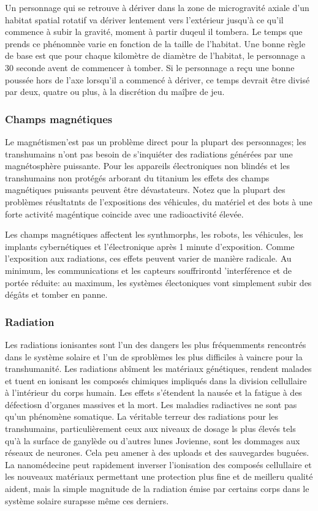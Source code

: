 Un personnage qui se retrouve à dériver dans la zone de microgravité axiale d'un habitat spatial rotatif va dériver lentement vers l'extérieur jusqu'à ce qu'il commence à subir la gravité, moment à partir duqeul il tombera. Le temps que prends ce phénomnèe varie en fonction de la taille de l'habitat. Une bonne règle de base est que pour chaque kilomètre de diamètre de l'habitat, le personnage a 30 seconde avent de commencer à tomber. Si le personnage a reçu une bonne poussée hors de l'axe lorsqu'il a commencé à dériver, ce temps devrait être divisé par deux, quatre ou plus, à la discrétion du maîþre de jeu. 

\subsubsection{Champs magnétiques} 

Le magnétismen'est pas un problème direct pour la plupart des personnages; les transhumains n'ont pas besoin de s'inquiéter des radiations générées par une magnétosphère puissante. Pour les appareils électroniques non blindés et les transhumains non protégés arborant du titanium les effets des champs magnétiques puissants peuvent être dévastateurs. Notez que la plupart des problèmes réusltatnts de l'expositions des véhicules, du matériel et des bots à une forte activité magéntique coincide avec une radioactivité élevée. 

Les champs magnétiques affectent les synthmorphs, les robots, les véhicules, les implants cybernétiques et l'électronique après 1 minute d'exposition. Comme l'exposition aux radiations, ces effets peuvent varier de manière radicale. Au minimum, les communications et les capteurs souffrirontd 'interférence et de portée réduite: au maximum, les systèmes électoniques vont simplement subir des dégâts et tomber en panne. 

\subsubsection{Radiation} 

Les radiations ionisantes sont l'un des dangers les plus fréquemments rencontrés dans le système solaire et l'un de sproblèmes les plus difficiles à vaincre pour la transhumanité. Les radiations abîment les matériaux génétiques, rendent malades et tuent en ionisant les composés chimiques impliqués dans la division cellullaire à l'intérieur du corps humain. Les effets s'étendent la nausée et la fatigue à des défectiosn d'organes massives et la mort. Les maladies radiactives ne sont pas qu'un phénomène somatique. La véritable terreur des radiations pour les transhumains, particulièrement ceux aux niveaux de dosage ls plus élevés tels qu'à la surface de ganylède ou d'autres lunes Jovienne, sont les dommages aux réseaux de neurones. Cela peu amener à des uploads et des sauvegardes buguées. La nanomédecine peut rapidement inverser l'ionisation des composés cellullaire et les nouveaux matériaux permettant une protection plus fine et de meilleru qualité aident, mais la simple magnitude de la radiation émise par certains corps dans le système solaire surapsse même ces derniers. 

